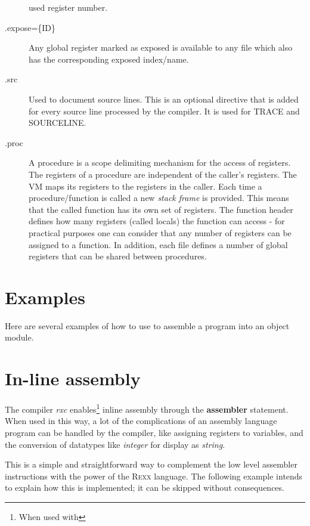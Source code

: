 \begin{description}
  used register number.
\item[.expose=\{ID\}]Any global register marked as exposed is available to any file which also has the corresponding exposed index/name.
\item[.src] Used to document source lines. This is an optional
  directive that is added for every source line processed by the
   compiler. It is used for TRACE and SOURCELINE.
\item[.proc] A procedure is a scope delimiting mechanism for the access of
  registers. The registers of a procedure are independent of the
  caller's registers. The VM maps its registers to the registers in
  the caller. Each time a procedure/function is called a new \emph{stack frame} is provided. This means that the called function has its own set of registers.
The function header defines how many registers (called locals) the
function can access - for practical purposes one can consider that any
number of registers can be assigned to a function. In addition, each file defines a number of global registers that can be shared between procedures.

\end{description}
\section{Examples}
Here are several examples of how to use  to
assemble a program into an object module.

\section{In-line assembly}\label{inlineAssembly}
The \crexx{} compiler \emph{rxc} enables\footnote{When used with
  } inline assembly through the
\textbf{assembler} statement. When used in this way, a lot of
the complications of an assembly language program can be handled by the
\crexx{} compiler, like assigning registers to variables, and the
conversion of datatypes like \emph{integer} for display as \emph{string}.


\begin{shaded}
  \small
{} \obeylines
{} \obeylines {}
 \end{shaded}

This is a simple and straightforward way to complement the low level
assembler instructions with the power of the \textsc{Rexx}
language. The following example intends to explain how this is
implemented; it can be skipped without consequences.

